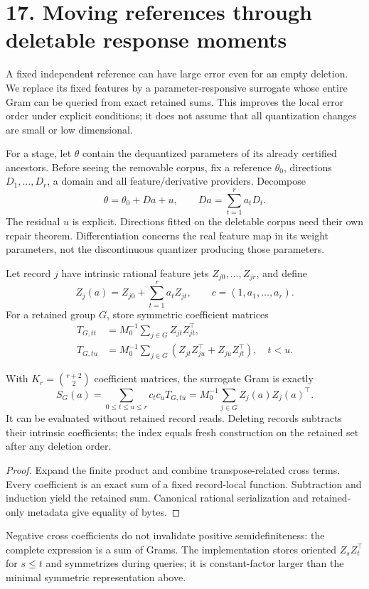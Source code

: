 \newpage
\section*{17. Moving references through deletable response moments}
 A fixed independent reference can have large error even for an empty deletion. We replace its fixed features by a parameter-responsive surrogate whose entire Gram can be queried from exact retained sums. This improves the local error order under explicit conditions; it does not assume that all quantization changes are small or low dimensional.

For a stage, let $\theta$ contain the dequantized parameters of its already certified ancestors. Before seeing the removable corpus, fix a reference $\theta_0$, directions $D_1,\ldots,D_r$, a domain and all feature/derivative providers. Decompose
\[
 \theta=\theta_0+Da+u,\qquad Da=\sum_{t=1}^r a_tD_t.
\]
The residual $u$ is explicit. Directions fitted on the deletable corpus need their own repair theorem. Differentiation concerns the real feature map in its weight parameters, not the discontinuous quantizer producing those parameters.

Let record $j$ have intrinsic rational feature jets $Z_{j0},\ldots,Z_{jr}$, and define
\[
 Z_j(a)=Z_{j0}+\sum_{t=1}^r a_tZ_{jt},\qquad c=(1,a_1,\ldots,a_r).
\]
For a retained group $G$, store symmetric coefficient matrices
\begin{align*}
 T_{G,tt}&=M_0^{-1}\sum_{j\in G}Z_{jt}Z_{jt}^{\top},\\
 T_{G,tu}&=M_0^{-1}\sum_{j\in G}(Z_{jt}Z_{ju}^{\top}+Z_{ju}Z_{jt}^{\top}),\quad t<u.
\end{align*}
\begin{theorem}
With $K_r=\binom{r+2}{2}$ coefficient matrices, the surrogate Gram is exactly
\[
 S_G(a)=\sum_{0\leq t\leq u\leq r}c_tc_uT_{G,tu}
       =M_0^{-1}\sum_{j\in G}Z_j(a)Z_j(a)^{\top}. \tag{19}
\]
It can be evaluated without retained record reads. Deleting records subtracts their intrinsic coefficients; the index equals fresh construction on the retained set after any deletion order.
\end{theorem}
\begin{proof}
Expand the finite product and combine transpose-related cross terms. Every coefficient is an exact sum of a fixed record-local function. Subtraction and induction yield the retained sum. Canonical rational serialization and retained-only metadata give equality of bytes.
\end{proof}
Negative cross coefficients do not invalidate positive semidefiniteness: the complete expression is a sum of Grams. The implementation stores oriented $Z_sZ_t^\top$ for $s\leq t$ and symmetrizes during queries; it is constant-factor larger than the minimal symmetric representation above.

